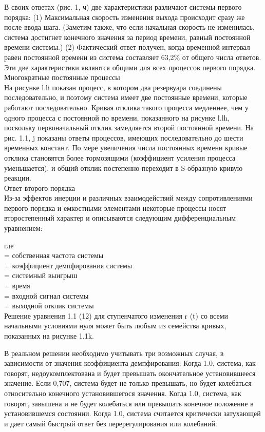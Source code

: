 \documentclass[aps,
12pt,
final,
oneside,
onecolumn,
musixtex, 
superscriptaddress,
centertags]{article}
\begin{document}
В своих ответах (рис. 1, ч) две характеристики различают системы первого порядка: (1) Максимальная скорость изменения выхода происходит сразу же после ввода шага. (Заметим также, что если начальная скорость не изменилась, система достигнет конечного значения за период времени, равный постоянной времени системы.) (2) Фактический ответ получен, когда временной интервал равен постоянной времени из
система составляет 63,2\% от общего числа ответов. Эти две характеристики являются общими для всех процессов первого порядка.\\

Многократные постоянные процессы\\

На рисунке l.li показан процесс, в котором два резервуара соединены последовательно, и поэтому система имеет две постоянные времени, которые работают последовательно. Кривая отклика такого процесса медленнее, чем у одного процесса с постоянной по времени, показанного на рисунке l.lh, поскольку первоначальный отклик замедляется второй постоянной времени.
На рис. 1.1, j показаны ответы процессов, имеющих последовательно до шести временных констант. По мере увеличения числа постоянных времени кривые отклика становятся более тормозящими (коэффициент усиления процесса уменьшается), и общий отклик постепенно переходит в S-образную кривую реакции.\\

Ответ второго порядка\\
Из-за эффектов инерции и различных взаимодействий между сопротивлениями первого порядка и емкостными элементами некоторые процессы носят второстепенный характер и описываются следующим дифференциальным уравнением:

где \\
 = собственная частота системы \\
 = коэффициент демпфирования системы \\
 = системный выигрыш \\
 = время \\
 = входной сигнал системы \\
 = выходной отклик системы \\

Решение уравнения 1.1 (12) для ступенчатого изменения r (t) со всеми начальными условиями нуля может быть любым из семейства кривых, показанных на рисунке 1.1k.

В реальном решении необходимо учитывать три возможных случая, в зависимости от значения коэффициента демпфирования:
Когда 1.0, система, как говорят, недоукомплектована и будет превышать окончательное установившееся значение. Если 0,707, система будет не только превышать, но будет колебаться относительно конечного установившегося значения.
Когда 1.0, система, как говорят, завышена и не будет колебаться или превышать конечное положение в установившемся состоянии.
Когда 1.0, система считается критически затухающей и дает самый быстрый ответ без перерегулирования или колебаний.
\end{document}
